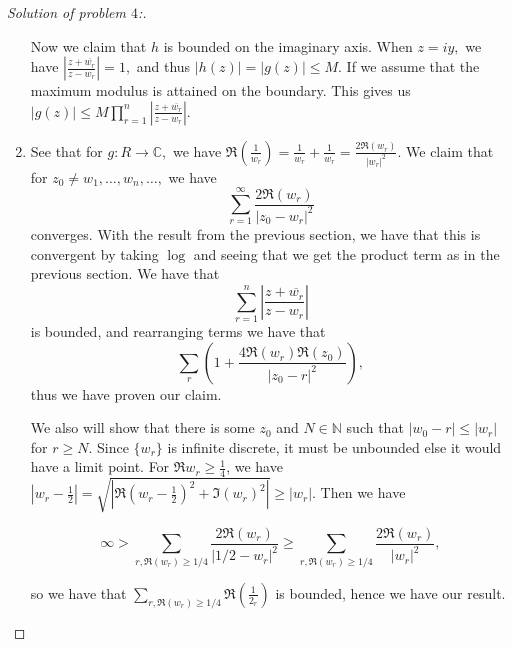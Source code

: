 \documentclass[letterpaper,11pt,twoside]{article}
\theoremstyle{proposition}
\theoremstyle{definition}
\theoremstyle{theorem}
\theoremstyle{definition}
\theoremstyle{definition}
\theoremstyle{definition}
\theoremstyle{lemma}
\theoremstyle{definition}
\theoremstyle{definition}
\theoremstyle{corollary}
\theoremstyle{definition}
\theoremstyle{definition}
\theoremstyle{definition}
\newcommand{\abs}[1]{\left \vert #1 \right \vert}
\begin{document}
\begin{proof}[Solution of problem $4$:]
\begin{enumerate}
Now we claim that $h$ is bounded on the imaginary axis. When $z=iy,$ we have $  \abs{\frac{z+\overline{w_r}}{z- w_r}} =1,$ and thus $\abs{h(z)} = \abs{g(z)} 
\leq M.$ If we assume that the maximum modulus is attained on the boundary. This gives us $\abs{g(z)} \leq M \prod_{r=1}^{n} \abs{\frac{z+\overline{w_r}}{z- 
w_r}}.$ 

\item See that for $g : R \to \mathbb{C},$ we have $\Re \left( \frac{1}{w_r} \right) = \frac{1}{w_r} + \frac{1}{w_r} = \frac{2 \Re ( w_r)}{\abs{w_r}^2}.$ 
We claim that for $z_0 \neq w_1, \dots, w_n, \dots,$ we have $$ \sum_{r=1}^{\infty} \frac{2\Re (w_r)}{\abs{z_0-w_r}^2} $$ converges. With the result from 
the previous section, we have that this is convergent by taking $\log$ and seeing that we get the product term as in the previous section. We have that $$ 
\sum_{r=1}^{n} \abs{\frac{z+\overline{w_r}}{z- w_r}}$$ is bounded, and rearranging terms we have that $$ \sum_{r} \left(  1+ \frac{4 \Re (w_r) 
\Re(z_0)}{\abs{z_0-r}^2}  \right),$$ thus we have proven our claim. 

We also will show that there is some $z_0$ and $N \in \mathbb{N}$ such that $\abs{w_0-r} \leq \abs{w_r}$ for $r \geq N.$ Since $\{w_r\}$ is infinite 
discrete, it must be unbounded else it would have a limit point. For $\Re w_r \geq \frac{1}{4}$, we have  $\abs{ w_r - \frac{1}{2} }= \sqrt{ \abs{  \Re 
\left( w_r - \frac{1}{2} \right)^2 + \Im (w_r)^2  }} \geq \abs{w_r}.$ Then we have 

$$ \infty > \sum_{r, \Re(w_r) \geq 1/4} \frac{2\Re (w_r)}{\abs{1/2 - w_r}^2} \geq  \sum_{r, \Re(w_r) \geq 1/4} \frac{2\Re (w_r)}{\abs{w_r}^2},$$ 

so we have that $ \sum_{r, \Re(w_r) \geq 1/4} \Re \left( \frac{1}{2_r} \right) $ is bounded, hence we have our result.  
	\end{enumerate}
	
	
	\end{proof}
\end{document}
